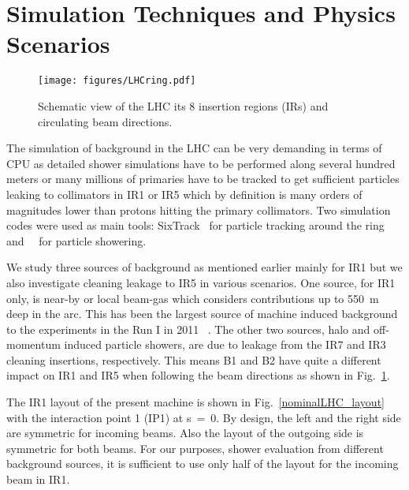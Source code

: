 \section{Simulation Techniques and Physics Scenarios\label{simSetup}}


\begin{figure}%
\begin{center}
\texttt{[image: figures/LHCring.pdf]}
\end{center}
\vspace{-0.6cm}
 \caption{Schematic view of the LHC its 8 insertion regions (IRs) and circulating beam directions.
  \label{LHCring}}
\end{figure}

The simulation of background in the LHC can be very demanding in terms of CPU as detailed shower simulations have to be performed along several hundred meters or many millions of primaries have to be tracked to get sufficient particles leaking to collimators in IR1 or IR5 which by definition is many orders of magnitudes lower than protons hitting the primary collimators. Two simulation codes were used as main tools: SixTrack~\cite{SixTrackRef} for particle tracking around the ring and \fluka~\cite{flukaRef1,flukaRef2}~for particle showering.

We study three sources of background as mentioned earlier mainly for IR1 but we also investigate cleaning leakage to IR5 in various scenarios. One source, for IR1 only, is near-by or local beam-gas which considers contributions up to 550~m deep in the arc. This has been the largest source of machine induced background to the experiments in the Run I in 2011 ~\cite{nimPaperRod}. The other two sources, halo and off-momentum induced particle showers, are due to leakage from the IR7 and IR3 cleaning insertions, respectively. This means B1 and B2 have quite a different impact on IR1 and IR5 when following the beam directions as shown in Fig.~\ref{LHCring}.

The IR1 layout of the present machine is shown in Fig.~\ref{nominalLHC_layout} with the interaction point 1 (IP1) at s~=~0. By design, the left and the right side are symmetric for incoming beams. Also the layout of the outgoing side is symmetric for both beams. For our purposes, shower evaluation from different background sources, it is sufficient to use only half of the layout for the incoming beam in IR1. 



